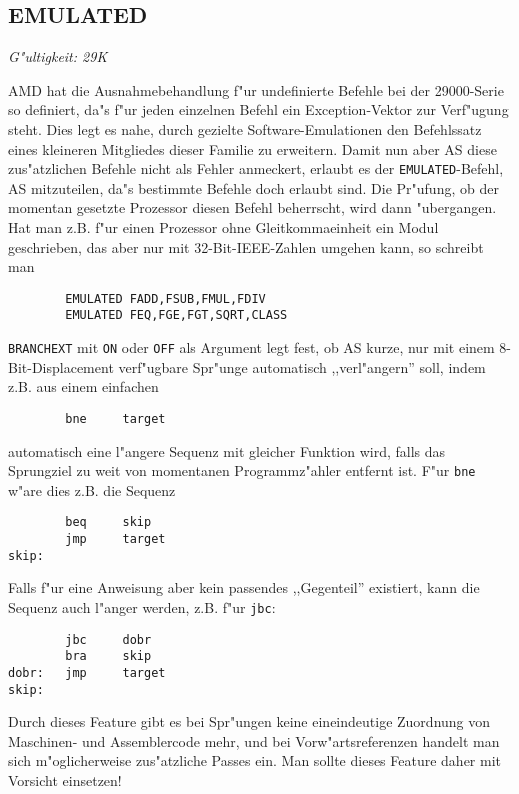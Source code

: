 \documentclass[12pt,a4paper,twoside]{report}
\makeatletter
\newcommand{\tty}[1]{{\tt #1}}
\newcommand{\ttindex}[1]{\index{#1@{\tt #1}}}
\makeatother
\begin{document}

\subsection{EMULATED}
\ttindex{EMULATED}

{\em G"ultigkeit: 29K}

AMD hat die Ausnahmebehandlung f"ur undefinierte Befehle bei der
29000-Serie so definiert, da"s f"ur jeden einzelnen Befehl ein
Exception-Vektor zur Verf"ugung steht.  Dies legt es nahe, durch
gezielte Software-Emulationen den Befehlssatz eines kleineren
Mitgliedes dieser Familie zu erweitern.  Damit nun aber AS diese
zus"atzlichen Befehle nicht als Fehler anmeckert, erlaubt es der
\tty{EMULATED}-Befehl, AS mitzuteilen, da"s bestimmte Befehle doch
erlaubt sind.  Die Pr"ufung, ob der momentan gesetzte Prozessor
diesen Befehl beherrscht, wird dann "ubergangen.  Hat man z.B. f"ur
einen Prozessor ohne Gleitkommaeinheit ein Modul geschrieben, das
aber nur mit 32-Bit-IEEE-Zahlen umgehen kann, so schreibt man
\begin{verbatim}
        EMULATED FADD,FSUB,FMUL,FDIV
        EMULATED FEQ,FGE,FGT,SQRT,CLASS
\end{verbatim}

{\tt BRANCHEXT} mit \tty{ON} oder \tty{OFF} als Argument legt fest, ob AS
kurze, nur mit einem 8-Bit-Displacement verf"ugbare Spr"unge automatisch
,,verl"angern'' soll, indem z.B. aus einem einfachen
\begin{verbatim}
        bne     target
\end{verbatim}
automatisch eine l"angere Sequenz mit gleicher Funktion wird, falls das
Sprungziel zu weit von momentanen Programmz"ahler entfernt ist.  F"ur
{\tt bne} w"are dies z.B. die Sequenz
\begin{verbatim}
        beq     skip
        jmp     target
skip:
\end{verbatim}
Falls f"ur eine Anweisung aber kein passendes ,,Gegenteil'' existiert,
kann die Sequenz auch l"anger werden, z.B. f"ur {\tt jbc}:
\begin{verbatim}
        jbc     dobr
        bra     skip
dobr:   jmp     target
skip:
\end{verbatim}
Durch dieses Feature gibt es bei Spr"ungen keine eineindeutige Zuordnung
von Maschinen- und Assemblercode mehr, und bei Vorw"artsreferenzen handelt
man sich m"oglicherweise zus"atzliche Passes ein.  Man sollte dieses
Feature daher mit Vorsicht einsetzen!
\end{document}
